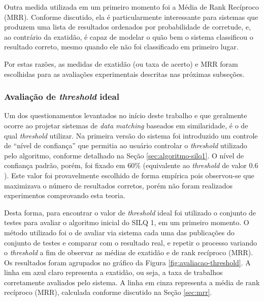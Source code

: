 \documentclass[12pt]{article}
\newcommand{\quotes}[1]{``#1''}
\begin{document}
Outra medida utilizada em um primeiro momento foi a Média de Rank Recíproco (MRR). Conforme discutido, ela é particularmente interessante para sistemas que produzem uma lista de resultados ordenados por probabilidade de corretude, e, ao contrário da exatidão, é capaz de modelar o quão bem o sistema classificou o resultado correto, mesmo quando ele não foi classificado em primeiro lugar.

Por estas razões, as medidas de exatidão (ou taxa de acerto) e MRR foram escolhidas para as avaliações experimentais descritas nas próximas subseções.

\subsubsection{Avaliação de \textit{threshold} ideal}

 Um dos questionamentos levantados no início deste trabalho e que geralmente ocorre ao projetar sistemas de \textit{data matching} baseados em similaridade, é o de qual \textit{threshold} utilizar. Na primeira versão do sistema foi introduzido um controle de \quotes{nível de confiança} que permitia ao usuário controlar o \textit{threshold} utilizado pelo algoritmo, conforme detalhado na Seção \ref{sec:algoritmo-silq1}. O nível de confiança padrão, porém, foi fixado em 60\% (equivalente ao \textit{threshold} de valor $0.6$). Este valor foi provavelmente escolhido de forma empírica pois observou-se que maximizava o número de resultados corretos, porém não foram realizados experimentos comprovando esta teoria.

 Desta forma, para encontrar o valor de \textit{threshold} ideal foi utilizado o conjunto de testes para avaliar o algoritmo inicial do SILQ 1, em um primeiro momento. O método utilizado foi o de avaliar via sistema cada uma das publicações do conjunto de testes e comparar com o resultado real, e repetir o processo variando o \textit{threshold} a fim de observar as médias de exatidão e de rank recíproco (MRR). Os resultados foram agrupados no gráfico da Figura \ref{fig:avaliacao-threshold}. A linha em azul claro representa a exatidão, ou seja, a taxa de trabalhos corretamente avaliados pelo sistema. A linha em cinza representa a média de rank recíproco (MRR), calculada conforme discutido na Seção \ref{sec:mrr}.
\end{document}
